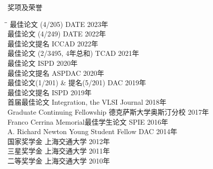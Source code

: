 
\begin{rSection}{奖项及荣誉}
\begin{tabbing}
\hspace{3.8in}\= \hspace{2.6in}\= \kill
最佳论文 (4/205) \> DATE \> { 2023年 } \\
最佳论文 (4/249) \> DATE \> { 2022年 } \\
最佳论文提名 \> ICCAD \> { 2022年 } \\
最佳论文 (2/3495, 4年总和) \> TCAD \> { 2021年 } \\
最佳论文 \> ISPD \> { 2020年 } \\
最佳论文提名 \> ASPDAC \> { 2020年 } \\
最佳论文(1/201) \& 提名(5/201) \> DAC \> { 2019年 } \\
最佳论文提名 \> ISPD \> { 2019年 } \\
首届最佳论文 \> Integration, the VLSI Journal \> { 2018年 } \\
Graduate Continuing Fellowship \> 德克萨斯大学奥斯汀分校 \> { 2017年 } \\
Franco Cerrina Memorial最佳学生论文 \> SPIE \> { 2016年 } \\
A. Richard Newton Young Student Fellow \> DAC \> { 2014年 } \\
国家奖学金 \> 上海交通大学 \> { 2012年 } \\
三星奖学金 \> 上海交通大学 \> { 2011年 } \\
二等奖学金 \> 上海交通大学 \> { 2010年 }
\end{tabbing}
\end{rSection}

